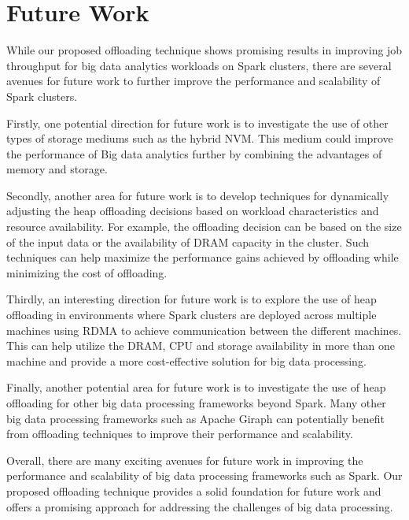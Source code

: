 \section{Future Work}

While our proposed offloading technique shows promising results in
improving job throughput for big data analytics workloads on Spark
clusters, there are several avenues for future work to further improve
the performance and scalability of Spark clusters. 

Firstly, one potential direction for future work is to investigate the
use of other types of storage mediums such as the hybrid NVM. This
medium could improve the performance of Big data analytics further by
combining the advantages of memory and storage.

Secondly, another area for future work is to develop techniques for
dynamically adjusting the heap offloading decisions based on workload
characteristics and resource availability. For example, the offloading
decision can be based on the size of the input data or the
availability of DRAM capacity in the cluster. Such techniques can help
maximize the performance gains achieved by offloading while minimizing
the cost of offloading.

Thirdly, an interesting direction for future work is to explore the
use of heap offloading in environments where Spark clusters are
deployed across multiple machines using RDMA to achieve communication
between the different machines. This can help utilize the DRAM, CPU
and storage availability in more than one machine and provide a more
cost-effective solution for big data processing.

Finally, another potential area for future work is to investigate the
use of heap offloading for other big data processing frameworks beyond
Spark. Many other big data processing frameworks such as Apache Giraph
can potentially benefit from offloading techniques to improve their
performance and scalability.

Overall, there are many exciting avenues for future work in improving
the performance and scalability of big data processing frameworks such
as Spark. Our proposed offloading technique provides a solid
foundation for future work and offers a promising approach for
addressing the challenges of big data processing.
